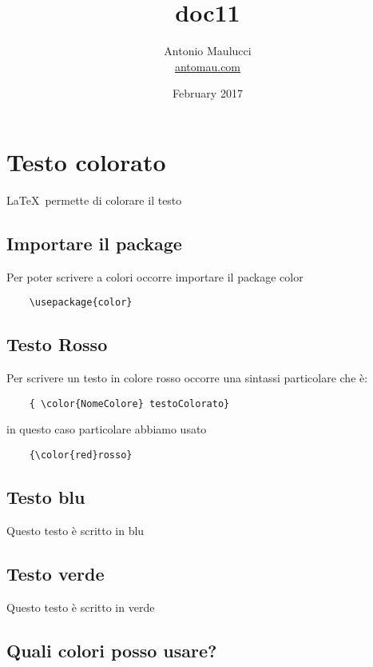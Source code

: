 \documentclass[a4paper, 11p]{article}
\title{{\color{red} doc11}}
\author{Antonio Maulucci\\ \href{http://www.antomau.com}{antomau.com}}
\date{February 2017}
\begin{document}
\maketitle

\section{Testo colorato}

\LaTeX\ permette di colorare il testo

\subsection{Importare il package}

Per poter scrivere a colori occorre importare il package color

\begin{verbatim}
    \usepackage{color}
\end{verbatim}

\subsection{Testo Rosso}

Per scrivere un testo in colore
{\color{red}rosso}
occorre una sintassi particolare che è:

\begin{verbatim}
    { \color{NomeColore} testoColorato}
\end{verbatim}

in questo caso particolare abbiamo usato

\begin{verbatim}
    {\color{red}rosso}
\end{verbatim}



\subsection{Testo blu}

{\color{blue}Questo testo è scritto in blu}

\subsection{Testo verde}

{\color{green}Questo testo è scritto in verde}

\subsection{Quali colori posso usare?}
\end{document}
